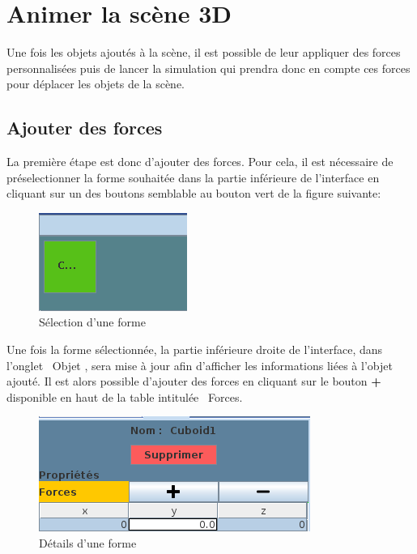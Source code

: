 \documentclass[11pt]{report}
\begin{document}

\chapter{Animer la scène 3D}

Une fois les objets ajoutés à la scène, il est possible de leur appliquer des forces personnalisées puis de lancer la simulation qui prendra
donc en compte ces forces pour déplacer les objets de la scène.

\section{Ajouter des forces}

La première étape est donc d'ajouter des forces. Pour cela, il est nécessaire de préselectionner la forme souhaitée dans la partie inférieure
de l'interface en cliquant sur un des boutons semblable au bouton vert de la figure suivante:

\begin{figure}[h]
  \centering
  \includegraphics{./bouton_forme.png}
  \caption{Sélection d'une forme}
\end{figure}

Une fois la forme sélectionnée, la partie inférieure droite de l'interface, dans l'onglet \flqq\ Objet \frqq, sera mise à jour afin d'afficher
les informations liées à l'objet ajouté. Il est alors possible d'ajouter des forces en cliquant sur le bouton \textbf{+} disponible en haut
de la table intitulée \flqq\ Forces\frqq.

\begin{figure}[h]
  \centering
  \includegraphics{./forces.png}
  \caption{Détails d'une forme}
\end{figure}
\end{document}
